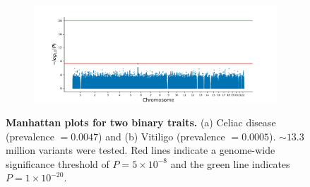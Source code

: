 \begin{figure}[h!]
\begin{subfigure}{.5\textwidth}
    \caption{}
    \end{subfigure}%
    \begin{subfigure}{.5\textwidth}
    \includegraphics[width=\textwidth]{figures/manhattan_bin/qd_Vitiligo.sumstats.gz.png}
    \caption{}
    \end{subfigure}
    \caption{\textbf{Manhattan plots for two binary traits.}
    (a) Celiac disease (prevalence $= 0.0047$) and (b) Vitiligo (prevalence $= 0.0005$).
    ${\sim}13.3$ million variants were tested.
    Red lines indicate a genome-wide significance threshold of $ P = 5 \times 10^{-8}$ and the green line indicates $P = 1 \times 10^{-20}$.    }
    \label{fig:qd_man_bin2}
\end{figure}



